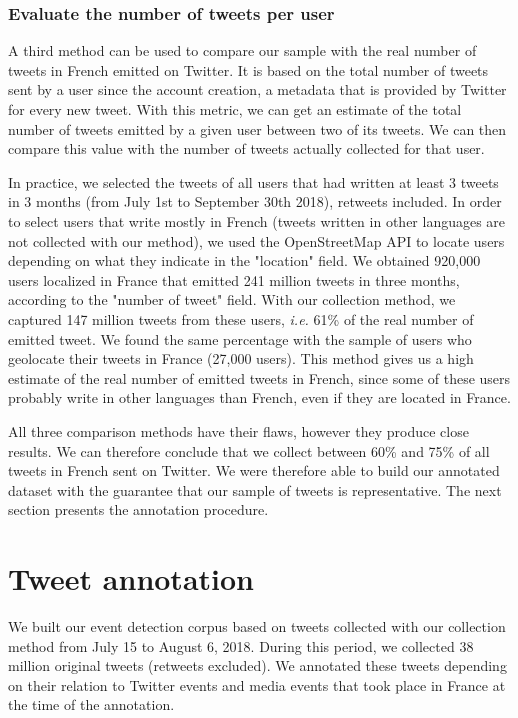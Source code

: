 \subsubsection{Evaluate the number of tweets per user}

A third method can be used to compare our sample with the real number of tweets in French emitted on Twitter. It is based on the total number of tweets sent by a user since the account creation, a metadata that is provided by Twitter for every new tweet. With this metric, we can get an estimate of the total number of tweets emitted by a given user between two of its tweets. We can then compare this value with the number of tweets actually collected for that user.

In practice, we selected the tweets of all users that had written at least 3 tweets in 3 months (from July 1st to September 30th 2018), retweets included. In order to select users that write mostly in French (tweets written in other languages are not collected with our method), we used the OpenStreetMap API to locate users depending on what they indicate in the "location" field. We obtained 920,000 users localized in France that emitted 241 million tweets in three months, according to the "number of tweet" field. With our collection method, we captured 147 million tweets from these users, \textit{i.e.} 61\% of the real number of emitted tweet. We found the same percentage with the sample of users who geolocate their tweets in France (27,000 users). This method gives us a high estimate of the real number of emitted tweets in French, since some of these users probably write in other languages than French, even if they are located in France.

All three comparison methods have their flaws, however they produce close results. We can therefore conclude that we collect between 60\% and 75\% of all tweets in French sent on Twitter. We were therefore able to build our annotated dataset with the guarantee that our sample of tweets is representative. The next section presents the annotation procedure.

\section{Tweet annotation}

We built our event detection corpus based on tweets collected with our collection method from July 15 to August 6, 2018. During this period, we collected 38 million original tweets (retweets excluded). We annotated these tweets depending on their relation to  Twitter events and media events that took place in France at the time of the annotation.
	

